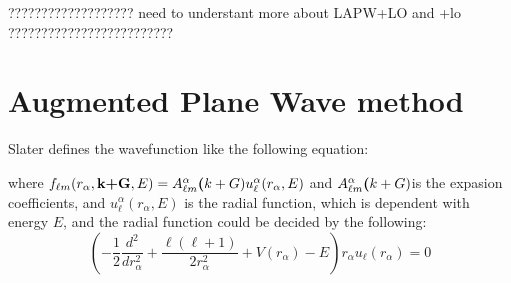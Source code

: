 \documentclass[a4paper, 12pt, titlepage,oneside,drop]{kthesis}
\begin{document}
{\color{red}??????????????????? need to understant more about LAPW+LO and +lo ?????????????????????????} 


\section{Augmented Plane Wave method}
\noindent Slater defines the wavefunction like the following equation:

\noindent where $f_{{\ell}{m}} (r_{\alpha},\textbf{k+G} ,E) =  A _{{\ell}m}^{\alpha} \textbf(k+G) u_{{\ell}}^{\alpha}(r_{\alpha}, E)$ and $A _{{\ell}m}^{\alpha} \textbf(k+G) $is the expasion coefficients, and $u_{{\ell}}^{\alpha} (r_{\alpha}, E)$  is the radial function, which is dependent with energy $E$, and the
radial function could be decided by the following:
\begin{equation}\label{ap2}
(-\frac{1}{2} \frac{d^2}{dr_{\alpha}^2} + \frac{\ell(\ell+1)}{2r_{\alpha}^2}+V(r_{\alpha})-E)r_{\alpha}u_{\ell}(r_{\alpha}) = 0
\end{equation}
\end{document}
